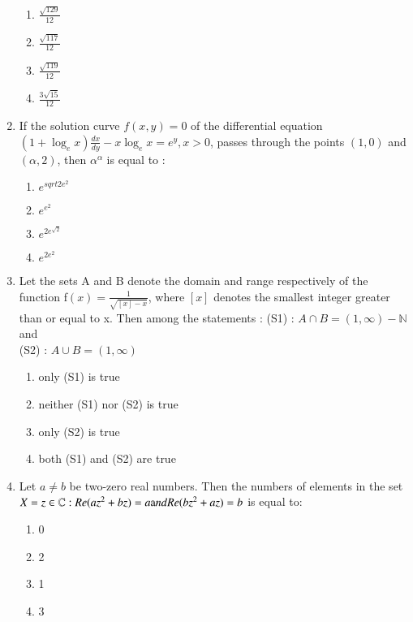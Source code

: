 \documentclass[journal,12pt,onecolumn]{IEEEtran}
\theoremstyle{remark}
\begin{document}
\begin{enumerate}
\begin{enumerate}
        \item $\frac{\sqrt{129}}{12}$ 
        \item $\frac{\sqrt{117}}{12}$
 \item $\frac{\sqrt{119}}{12}$ 
        \item $\frac{3\sqrt{15}}{12}$
\end{enumerate}
\item If the solution curve $f(x, y) = 0$ of the differential equation $(1+ \log_e x)\frac{dx}{dy} - x \log_e x =e^y, x>0$, passes through the points $(1, 0)$ and $(\alpha,2)$, then $\alpha ^{\alpha}$ is equal to :
        \begin{enumerate}
                \item $e^{sqrt{2}e^2}$
                \item $e^{e^2}$
                \item $e^{2e^{\sqrt{2}}}$ 
        \item $e^{2e^2}$    
\end{enumerate}
\item Let the sets A and B denote the domain and range respectively of the function f$(x)=\frac{1}{\sqrt{[x]-x}}$, where $[x]$ denotes the smallest integer greater than or equal to x. Then among the statements :
(S1) : $A \cap B = (1,\infty) - \mathbb{N}$ and \\
(S2) : $A \cup B = (1,\infty)$
 \begin{enumerate}
                \item only (S1) is true
                \item neither (S1) nor (S2) is true
                \item only (S2) is true
                \item both (S1) and (S2) are true
\end{enumerate}
\item Let $a \neq b$ be two-zero real numbers. Then the numbers of elements in the set \\ $X = {z \in \mathbb{C}:Re(az^2+bz)=a \text and Re(bz^2+az)=b}$ is equal to:
\begin{enumerate}
                \item 0
                \item 2
                \item 1
                \item 3
\end{enumerate}
 \end{enumerate}
\end{document}
